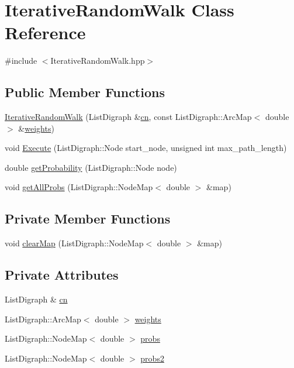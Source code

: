 \hypertarget{class_iterative_random_walk}{\section{Iterative\+Random\+Walk Class Reference}
\label{class_iterative_random_walk}
}


{\ttfamily \#include $<$Iterative\+Random\+Walk.\+hpp$>$}

\subsection*{Public Member Functions}
\begin{DoxyCompactItemize}
\item 
\hyperlink{class_iterative_random_walk_aeafabd76816f035098fa82559fe6cae8}{Iterative\+Random\+Walk} (List\+Digraph \&\hyperlink{class_iterative_random_walk_ae71268b542c6fc06c8f06ac036f37a98}{cn}, const List\+Digraph\+::\+Arc\+Map$<$ double $>$ \&\hyperlink{class_iterative_random_walk_a94c0548c8109da4fa45aa103489b3082}{weights})
\item 
void \hyperlink{class_iterative_random_walk_a32a6e92c66551180eee6678b3950fbde}{Execute} (List\+Digraph\+::\+Node start\+\_\+node, unsigned int max\+\_\+path\+\_\+length)
\item 
double \hyperlink{class_iterative_random_walk_ab93a43e6a33a6e5c2d2481a96b009f78}{get\+Probability} (List\+Digraph\+::\+Node node)
\item 
void \hyperlink{class_iterative_random_walk_a6846564581c854849709f706db24511b}{get\+All\+Probs} (List\+Digraph\+::\+Node\+Map$<$ double $>$ \&map)
\end{DoxyCompactItemize}
\subsection*{Private Member Functions}
\begin{DoxyCompactItemize}
\item 
void \hyperlink{class_iterative_random_walk_adda57dd53cc3646676815dc7d783c51e}{clear\+Map} (List\+Digraph\+::\+Node\+Map$<$ double $>$ \&map)
\end{DoxyCompactItemize}
\subsection*{Private Attributes}
\begin{DoxyCompactItemize}
\item 
List\+Digraph \& \hyperlink{class_iterative_random_walk_ae71268b542c6fc06c8f06ac036f37a98}{cn}
\item 
List\+Digraph\+::\+Arc\+Map$<$ double $>$ \hyperlink{class_iterative_random_walk_a94c0548c8109da4fa45aa103489b3082}{weights}
\item 
List\+Digraph\+::\+Node\+Map$<$ double $>$ \hyperlink{class_iterative_random_walk_a74a536e7874d7ee633f02a690db02b46}{probs}
\item 
List\+Digraph\+::\+Node\+Map$<$ double $>$ \hyperlink{class_iterative_random_walk_abf23a7d229dba3c619f3e05527ca2a7f}{probs2}
\end{DoxyCompactItemize}


